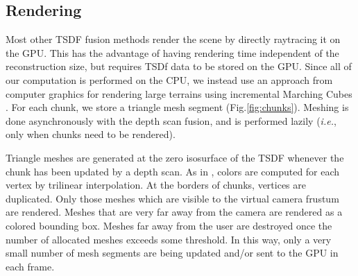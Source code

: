 \documentclass[conference]{IEEEtran}
\newcommand{\figref}[1]{Fig.\ref{#1}}
\newcommand{\ie}{\textit{i.e.}\xspace}
\newcommand{\TSDF}{TSDF\xspace}
\begin{document}
\subsection{Rendering}
\label{section:render}
Most other \TSDF fusion methods \cite{Newcombe, NiessnerHashing} render the
scene by directly raytracing it on the GPU. This has the advantage of having
rendering time independent of the reconstruction size, but requires TSDf data to
be stored on the GPU.  Since all of our computation is performed on the CPU,
we instead use an approach from computer graphics for rendering large terrains
\cite{GPUGEMS3} using incremental Marching Cubes \cite{Lorensen1987}.
For each chunk, we store a triangle mesh segment (\figref{fig:chunks}).
Meshing is done asynchronously with the depth scan fusion, and is performed
lazily (\ie, only when chunks need to be rendered).

Triangle meshes are generated at the zero isosurface of the \TSDF whenever the
chunk has been updated by a depth scan. As in \cite{Bylow2013, Whelan2013},  colors are
computed for each vertex by trilinear interpolation. At the borders of chunks,
vertices are duplicated. Only those meshes which are visible to the virtual camera
frustum are rendered. Meshes that are very far away from the camera are
rendered as a colored bounding box. Meshes far away from the user are
destroyed once the number of allocated meshes exceeds some threshold. In this
way, only a very small number of mesh segments are being updated and/or sent to
the GPU in each frame.
\end{document}
